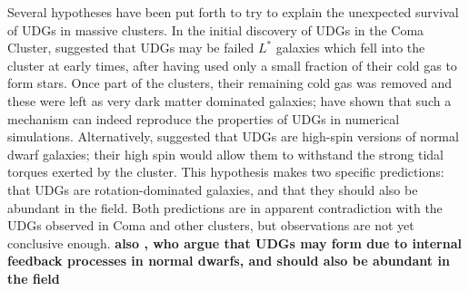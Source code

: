 \documentclass[usenatbib,fleqn]{mnras}
\begin{document}
Several hypotheses have been put forth to try to explain the unexpected survival of UDGs in massive clusters. In the initial discovery of UDGs in the Coma Cluster, \cite{vandokkum15} suggested that UDGs may be failed $L^*$ galaxies which fell into the cluster at early times, after having used only a small fraction of their cold gas to form stars. Once part of the clusters, their remaining cold gas was removed and these were left as very dark matter dominated galaxies; %
\cite{yozin15} have shown that such a mechanism can indeed reproduce the properties of UDGs in numerical simulations.
Alternatively, \cite{amorisco16} suggested that UDGs are high-spin versions of normal dwarf galaxies; their high spin would allow them to withstand the strong tidal torques exerted by the cluster. This hypothesis makes two specific predictions: that UDGs are rotation-dominated galaxies, and that they should also be abundant in the field. Both predictions are in apparent contradiction with the UDGs observed in Coma and other clusters, but observations are not yet conclusive enough.
\textbf{also \cite{dicintio16}, who argue that UDGs may form due to internal feedback processes in normal dwarfs, and should also be abundant in the field}
\end{document}
